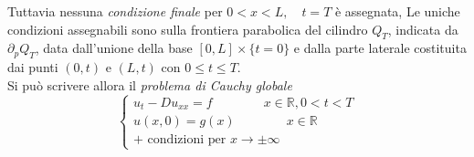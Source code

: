 \documentclass[a4paper,12pt, draft]{article}
\theoremstyle{break}
\numberwithin{equation}{section}
\begin{document}
Tuttavia nessuna \emph{condizione finale} per $0 < x < L, \quad t = T$ è assegnata, Le uniche condizioni assegnabili sono sulla frontiera parabolica del cilindro $Q_T$, indicata da $\partial_p Q_T$, data dall'unione della base $[0, L] \times \{t=0\}$ e dalla parte laterale costituita dai punti $(0,t) \mbox{ e } (L,t)$ con $0 \leq t \leq T$. \\
Si può scrivere allora il \emph{problema di Cauchy globale}
\begin{equation}
\begin{cases}
u_t -D u_{xx} = f \qquad \qquad x \in \mathbb{R}, 0<t<T\\
u(x, 0) = g(x) \qquad \qquad x\in \mathbb{R}\\
\mbox{+ condizioni per } x \to \pm \infty
\end{cases}
\end{equation}
\end{document}

